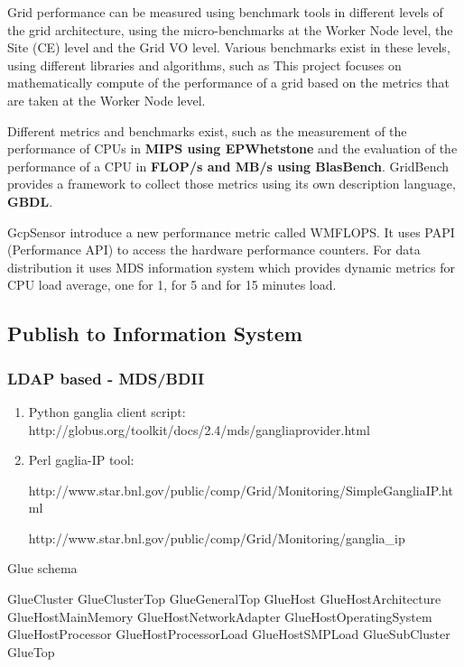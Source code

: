 Grid performance can be measured using benchmark tools in different levels of
the grid architecture, using the micro-benchmarks at the Worker Node level, the
Site (CE) level and the Grid VO level. Various benchmarks exist in these
levels, using different libraries and algorithms, such as  This project focuses
on mathematically compute of the performance of a grid based on the metrics that
are taken at the Worker Node level.

Different metrics and benchmarks exist, such as the measurement of
the performance of CPUs in {\bf MIPS using EPWhetstone} and the evaluation of
the performance of a CPU in {\bf FLOP/s and MB/s using BlasBench}. GridBench
\cite{gridbench} provides a framework to collect those metrics using its own
description language, {\bf GBDL}.

GcpSensor \cite{gcpsensor} introduce a new performance metric called WMFLOPS. It
uses PAPI \cite{papi} (Performance API) to access the hardware performance
counters. For data distribution it uses MDS information system which provides
dynamic metrics for CPU load average, one for 1, for 5 and for 15 minutes load.

\subsection{Publish to Information System}

\subsubsection{LDAP based - MDS/BDII}
\begin{enumerate}
  \item Python ganglia client script:
  http://globus.org/toolkit/docs/2.4/mds/gangliaprovider.html
  \item Perl gaglia-IP tool:
  
  http://www.star.bnl.gov/public/comp/Grid/Monitoring/SimpleGangliaIP.html
  
  http://www.star.bnl.gov/public/comp/Grid/Monitoring/ganglia\_ip

\end{enumerate}

Glue schema

GlueCluster
GlueClusterTop
GlueGeneralTop
GlueHost
GlueHostArchitecture
GlueHostMainMemory
GlueHostNetworkAdapter
GlueHostOperatingSystem
GlueHostProcessor
GlueHostProcessorLoad
GlueHostSMPLoad
GlueSubCluster
GlueTop

